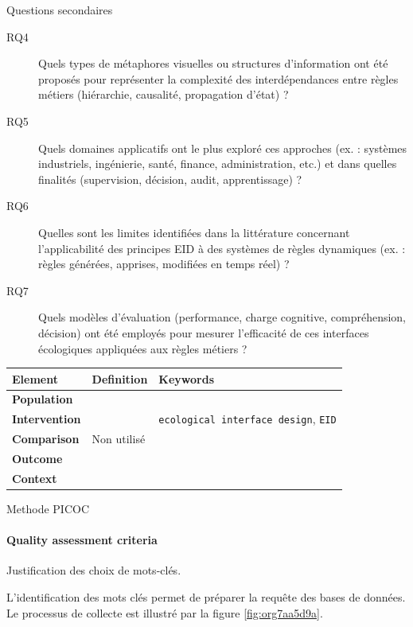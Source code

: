 \documentclass[a4paper,12pt]{article}
\begin{document}
Questions secondaires
\begin{description}
\item[{\label{org44f66f4}RQ4}] Quels types de métaphores visuelles ou structures d’information ont été proposés pour représenter la complexité des interdépendances entre règles métiers (hiérarchie, causalité, propagation d’état) ?
\item[{\label{orga733c3a}RQ5}] Quels domaines applicatifs ont le plus exploré ces approches (ex. : systèmes industriels, ingénierie, santé, finance, administration, etc.) et dans quelles finalités (supervision, décision, audit, apprentissage) ?
\item[{\label{org244ddbb}RQ6}] Quelles sont les limites identifiées dans la littérature concernant l’applicabilité des principes EID à des systèmes de règles dynamiques (ex. : règles générées, apprises, modifiées en temps réel) ?
\item[{\label{org9ab74c7}RQ7}] Quels modèles d’évaluation (performance, charge cognitive, compréhension, décision) ont été employés pour mesurer l’efficacité de ces interfaces écologiques appliquées aux règles métiers ?
\end{description}


\begin{TABLE}
\begin{center}
\begin{tabular}{lll}
\hline
Element & Definition & Keywords\\
\hline
\textbf{\textbf{Population}} &  & \\
\textbf{\textbf{Intervention}} &  & \texttt{ecological interface design}, \texttt{EID}\\
\textbf{\textbf{Comparison}} & Non utilisé & \\
\textbf{\textbf{Outcome}} &  & \\
\textbf{\textbf{Context}} &  & \\
\hline
\end{tabular}
\end{center}
\caption{\label{org198828c}Methode PICOC}
\end{TABLE}
\paragraph*{Quality assessment criteria}
\label{sec:org71f55c2}
Justification des choix de mots-clés.

L'identification des mots clés permet de préparer la requête des bases de données. Le processus de collecte est illustré par la figure \ref{fig:org7aa5d9a}.
\end{document}
